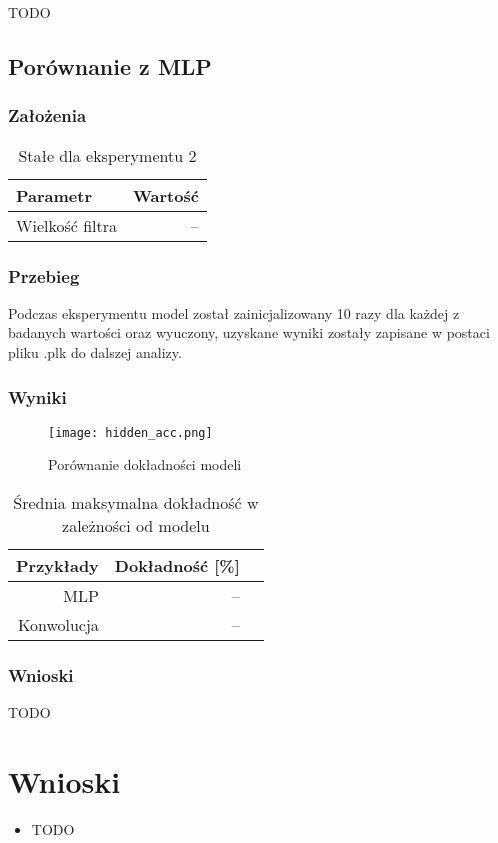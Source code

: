 \documentclass{article}
\begin{document}
TODO

\newpage
\subsection{Porównanie z MLP}
\subsubsection*{Założenia}
\begin{table}[H]
	\caption{Stałe dla eksperymentu 2}
	\label{tabela-const-2}
	\centering
	\begin{tabular}{lr}
		\toprule
		Parametr          & Wartość \\
		\midrule
		Wielkość filtra & --        \\
		\bottomrule
	\end{tabular}
\end{table}

\subsubsection*{Przebieg}

Podczas eksperymentu model został zainicjalizowany 10 razy dla każdej z badanych wartości oraz wyuczony, uzyskane wyniki zostały zapisane w postaci pliku .plk do dalszej analizy.

\subsubsection*{Wyniki}
\begin{figure}[H]
	\centering
	\caption{Porównanie dokładności modeli}
	\texttt{[image: hidden\_acc.png]}
	\label{fig:res21}
\end{figure}

\begin{table}[H]
	\caption{Średnia maksymalna dokładność w zależności od modelu}
	\label{tabela-res-21}
	\centering
	\begin{tabular}{rrr}
		\toprule
		Przykłady & Dokładność [\%] \\
		\midrule
		MLP        & --                 \\
		Konwolucja & --                 \\
		\bottomrule
	\end{tabular}
\end{table}

\subsubsection*{Wnioski}

TODO

\newpage
\section{Wnioski}

\begin{itemize}
	\item TODO
\end{itemize}
\end{document}
